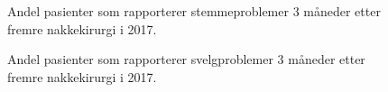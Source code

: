 \documentclass [norsk,a4paper,twoside]{article}\usepackage[]{graphicx}\usepackage[]{color}
\begin{document}
\begin{figure}[ht]
\caption{\label{fig:NakkeStemme3mndSh} Andel pasienter som rapporterer stemmeproblemer 3 måneder etter fremre nakkekirurgi i 2017.}
\end{figure}

\begin{figure}[ht]
\caption{\label{fig:NakkeSvelg3mndSh} Andel pasienter som rapporterer svelgproblemer 3 måneder etter fremre nakkekirurgi i 2017.}
\end{figure}







      
      
 
\end{document}
